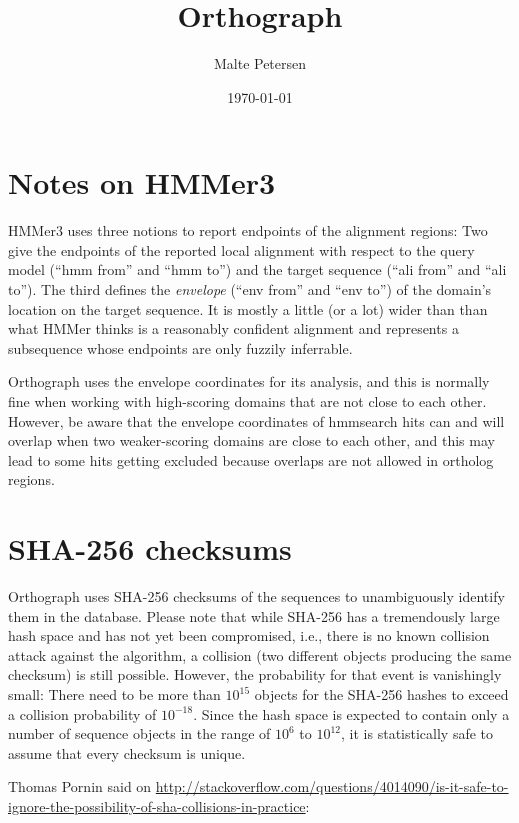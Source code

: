\documentclass[a4paper]{scrartcl}
\title{Orthograph}
\author{Malte Petersen}
\date{\today}
\begin{document}
\maketitle
\tableofcontents

\section{Notes on HMMer3}

HMMer3 uses three notions to report endpoints of the alignment regions: Two
give the endpoints of the reported local alignment with respect to the query
model (``hmm from'' and ``hmm to'') and the target sequence (``ali from'' and
``ali to''). The third defines the \emph{envelope} (``env from'' and ``env to'')
of the domain's location on the target sequence. It is mostly a little (or a
lot) wider than than what HMMer thinks is a reasonably confident alignment and
represents a subsequence whose endpoints are only fuzzily inferrable.

Orthograph uses the envelope coordinates for its analysis, and this is normally
fine when working with high-scoring domains that are not close to each other.
However, be aware that the envelope coordinates of hmmsearch hits can and will
overlap when two weaker-scoring domains are close to each other, and this may
lead to some hits getting excluded because overlaps are not allowed in ortholog
regions. 

\section{SHA-256 checksums}

Orthograph uses SHA-256 checksums of the sequences to unambiguously identify
them in the database. Please note that while SHA-256 has a tremendously large
hash space and has not yet been compromised, i.e., there is no known collision
attack against the algorithm, a collision (two different objects producing the
same checksum) is still possible. However, the probability for that event is
vanishingly small: There need to be more than $10^{15}$ objects for the SHA-256
hashes to exceed a collision probability of $10^{-18}$. Since the hash space is
expected to contain only a number of sequence objects in the range of $10^6$ to
$10^{12}$, it is statistically safe to assume that every checksum is unique. 

Thomas Pornin said on \href{http://stackoverflow.com/questions/4014090/is-it-safe-to-ignore-the-possibility-of-sha-collisions-in-practice}{http://stackoverflow.com/questions/4014090/is-it-safe-to-ignore-the-possibility-of-sha-collisions-in-practice}:
\end{document}
